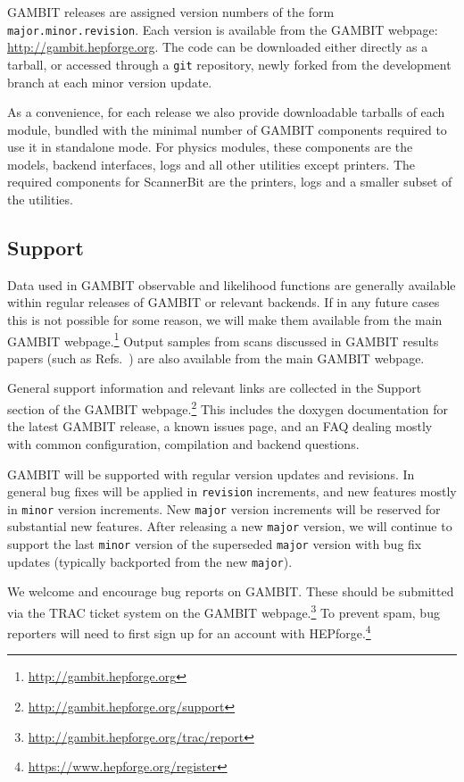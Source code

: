 \documentclass[pdftex,twocolumn,epjc3_preprint,runningheads]{svjour3}
\renewcommand{\_}{\discretionary{\underscore}{}{\underscore}}
\newcommand\term[1]{{\lstset{style=terminal}\lstinline!#1!\lstset{style=cpp}}}
\newcommand{\gambit}{\textsf{GAMBIT}\xspace}
\newcommand{\scannerbit}{\textsf{ScannerBit}\xspace}
\newcommand{\GB}{\gambit}
\begin{document}
\GB releases are assigned version numbers of the form \term{major.minor.revision}.  Each version is available from the \GB webpage: \href{http://gambit.hepforge.org}{http://gambit.hepforge.org}.  The code can be downloaded  either directly as a tarball, or accessed through a \term{git} repository, newly forked from the development branch at each minor version update.

As a convenience, for each release we also provide downloadable tarballs of each module, bundled with the minimal number of \GB components required to use it in standalone mode.  For physics modules, these components are the models, backend interfaces, logs and all other utilities except printers.  The required components for \scannerbit are the printers, logs and a smaller subset of the utilities.

\subsection{Support}

Data used in \GB observable and likelihood functions are generally available within regular releases of \GB or relevant backends.  If in any future cases this is not possible for some reason, we will make them available from the main \GB webpage.\footnote{\href{http://gambit.hepforge.org}{http://gambit.hepforge.org}}  Output samples from scans discussed in \GB results papers (such as Refs.\ \cite{CMSSM,MSSM,SSDM}) are also available from the main \GB webpage.

General support information and relevant links are collected in the Support section of the \GB webpage.\footnote{\href{http://gambit.hepforge.org/support}{http://gambit.hepforge.org/support}}  This includes the doxygen documentation for the latest \GB release, a known issues page, and an FAQ dealing mostly with common configuration, compilation and backend questions.

\GB will be supported with regular version updates and revisions.  In general bug fixes will be applied in \term{revision} increments, and new features mostly in \term{minor} version increments.  New \term{major} version increments will be reserved for substantial new features.  After releasing a new \term{major} version, we will continue to support the last \term{minor} version of the superseded \term{major} version with bug fix updates (typically backported from the new \term{major}).

We welcome and encourage bug reports on \GB.  These should be submitted via the \textsf{TRAC} ticket system on the \GB webpage.\footnote{\href{http://gambit.hepforge.org/trac/report}{http://gambit.hepforge.org/trac/report}}  To prevent spam, bug reporters will need to first sign up for an account with \textsf{HEPforge}.\footnote{\href{http://www.hepforge.org/register}{https://www.hepforge.org/register}}
\end{document}
